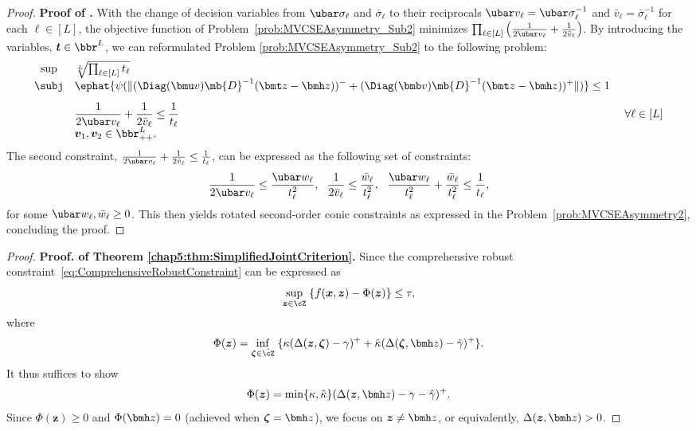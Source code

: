 \documentclass[opre, blindrev]{informs4}
\newcommand{\1}[1]{\mathds{1}{\left(#1\right)}}
\begin{document}
\begin{appendices}
\begin{proof}{\bf Proof of .}
With the change of decision variables from $\ubar \sigma_{\ell}$ and $\bar \sigma_{\ell}$ to their reciprocals $\ubar v_{\ell} = \ubar \sigma^{-1}_{\ell}$ and $\bar v_{\ell} = \bar \sigma^{-1}_{\ell}$ for each $\ell \in [L]$, the objective function of Problem~\eqref{prob:MVCSEAsymmetry_Sub2} minimizes
$\prod_{\ell \in [L]} \left(\frac{1}{2\ubar v_{\ell}} + \frac{1}{2\bar v_{\ell}}\right)$. By introducing the variables, $\bm t \in \bbr^L$, we can reformulated Problem \eqref{prob:MVCSEAsymmetry_Sub2} to the following problem:
\[
\begin{array}{cll}
\sup & \sqrt[L]{\prod_{\ell \in [L]} t_\ell}  \\
\subj & \displaystyle\ephat{\psi(\|(\Diag(\bmu v)\mb{D}^{-1}(\bmt z - \bmh z))^- + (\Diag(\bmb v)\mb{D}^{-1}(\bmt z - \bmh z))^+\|)} \leq 1 \\[3mm]
& \displaystyle \frac{1}{2\ubar v_{\ell}} + \frac{1}{2\bar v_{\ell}} \leq \frac{1}{t_{\ell}} &~\forall \ell \in [L] \\
& \bm v_1,\bm v_2 \in \bbr^L_{++}.  
\end{array} 
\]
The second constraint, $\frac{1}{2\ubar v_{\ell}} + \frac{1}{2\bar v_{\ell}} \leq \frac{1}{t_{\ell}}$, can be expressed as the following set of constraints:
$$
\frac{1}{2 \ubar v_{\ell}} \leq \frac{ \ubar w_{\ell}}{t^2_\ell}, ~~\frac{1}{2 \bar v_{\ell}} \leq \frac{\bar w_{\ell}}{t^2_\ell}, ~~  \frac{\ubar w_{\ell}}{t^2_\ell} + \frac{\bar w_{\ell}}{t^2_\ell}  \leq \frac{1}{t_\ell}, 
$$
for some $\ubar w_{\ell},\bar w_{\ell} \geq 0$. This then yields rotated second-order conic constraints as expressed in the Problem~\eqref{prob:MVCSEAsymmetry2}, concluding the proof. 
\hfill \Halmos
\end{proof}
\vspace{3mm}

\begin{proof}{\bf Proof. of Theorem \ref{chap5:thm:SimplifiedJointCriterion}.}
Since the comprehensive robust constraint~\eqref{eq:ComprehensiveRobustConstraint} can be expressed as
$$
\sup_{\bm{z}\in \cZ} \; \{ f(\bm{x}, \bm{z}) - \Phi(\bm z)\} \leq \tau,
$$
where
$$
\Phi(\bm z) = \inf_{\bm \zeta \in \hat \cZ} \; \{ \kappa (\Delta(\bm z,\bm \zeta) - \gamma)^+ + \hat \kappa ( \Delta(\bm \zeta,\bmh z) - \hat \gamma)^+ \}.
$$
It thus suffices to show 
$$
\Phi(\bm z) = \min\{\kappa,\hat \kappa\}( \Delta(\bm z,\bmh z) - \gamma -\hat \gamma)^+.
$$
Since $\Phi(\bm z) \geq 0$ and $\Phi(\bmh z)=0$ (achieved when $\bm \zeta = \bmh z$), we focus on $\bm z \neq \bmh z$, or equivalently, $\Delta(\bm z,\bmh z)>0$. 


\end{proof}
\end{appendices}
\end{document}

